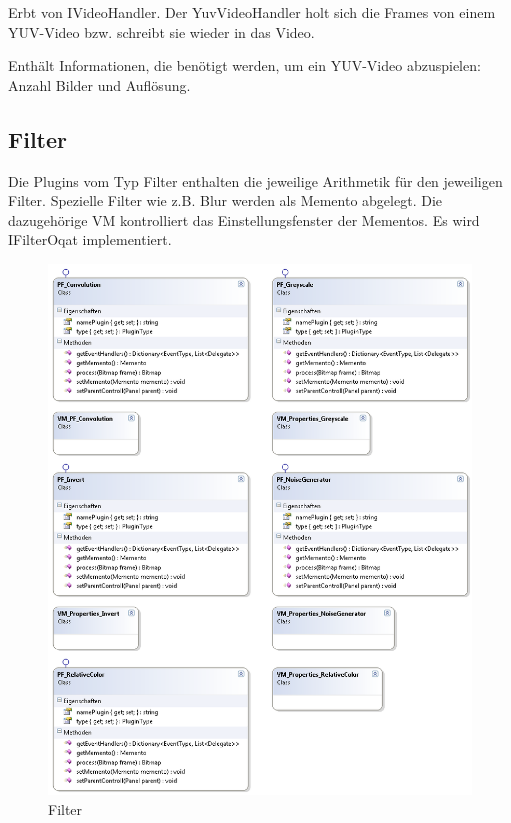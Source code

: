 Erbt von IVideoHandler. Der YuvVideoHandler holt sich die Frames von einem YUV-Video bzw. schreibt sie wieder in das Video.


Enthält Informationen, die benötigt werden, um ein YUV-Video abzuspielen: Anzahl Bilder und Auflösung.



\pagebreak
\subsection{Filter}
Die Plugins vom Typ Filter enthalten die jeweilige Arithmetik für den jeweiligen Filter. Spezielle Filter wie z.B. Blur werden als Memento abgelegt. Die dazugehörige VM kontrolliert das Einstellungsfenster der Mementos. Es wird IFilterOqat  implementiert.
\begin{figure}[H]
\noindent\includegraphics[width=\linewidth,height=\textheight,
keepaspectratio]{bilder/Klassendiagramm/Plugins3.png}
\caption{Filter}
\end{figure}


